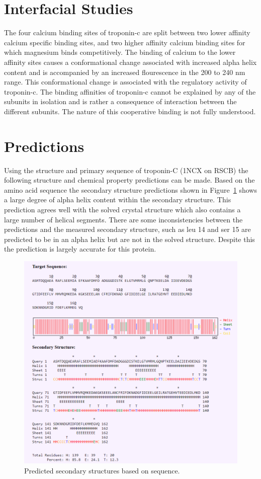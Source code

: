 \documentclass[12pt]{article}
\begin{document}
\section{Interfacial Studies}
The four calcium binding sites of troponin-c are split between two lower affinity calcium specific binding sites, and two higher affinity calcium binding sites for which magnesium binds competitively. The binding of calcium to the lower affinity sites causes a conformational change associated with increased alpha helix content and is accompanied by an increased flourescence in the 200 to 240 nm range. This conformational change is associated with the regulatory activity of troponin-c. The binding affinities of troponin-c cannot be explained by any of the subunits in isolation and is rather a consequence of interaction between the different subunits. The nature of this cooperative binding is not fully understood.

\section{Predictions}
Using the structure and primary sequence of troponin-C (1NCX on RSCB) the following structure and chemical property predictions can be made. Based on the amino acid sequence the secondary structure predictions shown in Figure~\ref{secondStruct} shows a large degree of alpha helix content within the secondary structure. This prediction agrees well with the solved crystal structure which also contains a large number of helical segments. There are some inconsistencies between the predictions and the measured secondary structure, such as leu 14 and ser 15 are predicted to be in an alpha helix but are not in the solved structure. Despite this the prediction is largely accurate for this protein.

\begin{figure}[H]
	\centering
	\includegraphics[width=.95\linewidth]{SecondaryStructureAnalysisPlot.png}
	
	\caption{Predicted secondary structures based on sequence.}
	\label{secondStruct}
\end{figure}
\end{document}
